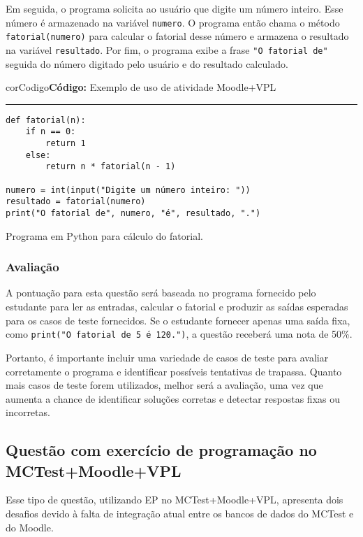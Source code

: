 Em seguida, o programa solicita ao usuário que digite um número inteiro. Esse número é armazenado na variável \verb|numero|. O programa então chama o método \verb|fatorial(numero)| para calcular o fatorial desse número e armazena o resultado na variável \verb|resultado|. Por fim, o programa exibe a frase \verb|"O fatorial de"| seguida do número digitado pelo usuário e do resultado calculado.

\begin{listing}[!ht]
\begin{myboxCode}{corCodigo}{\textbf{Código: } Exemplo de uso de atividade Moodle+VPL}\vspace{3mm}
\hrule
\begin{verbatim}
def fatorial(n):
    if n == 0:
        return 1
    else:
        return n * fatorial(n - 1)

numero = int(input("Digite um número inteiro: "))
resultado = fatorial(numero)
print("O fatorial de", numero, "é", resultado, ".")
\end{verbatim}
\end{myboxCode}
\caption{Programa em Python para cálculo do fatorial.}
\label{lst:fatorial}
\end{listing}


\subsubsection{Avaliação}

A pontuação para esta questão será baseada no programa fornecido pelo estudante para ler as entradas, calcular o fatorial e produzir as saídas esperadas para os casos de teste fornecidos. Se o estudante fornecer apenas uma saída fixa, como \verb|print("O fatorial de 5 é 120.")|, a questão receberá uma nota de 50\%.

Portanto, é importante incluir uma variedade de casos de teste para avaliar corretamente o programa e identificar possíveis tentativas de trapassa. Quanto mais casos de teste forem utilizados, melhor será a avaliação, uma vez que aumenta a chance de identificar soluções corretas e detectar respostas fixas ou incorretas.


\subsection{Questão com exercício de programação no MCTest+Moodle+VPL}\label{sec:questao_VPL}

Esse tipo de questão, utilizando EP no MCTest+Moodle+VPL, apresenta dois desafios devido à falta de integração atual entre os bancos de dados do MCTest e do Moodle.

